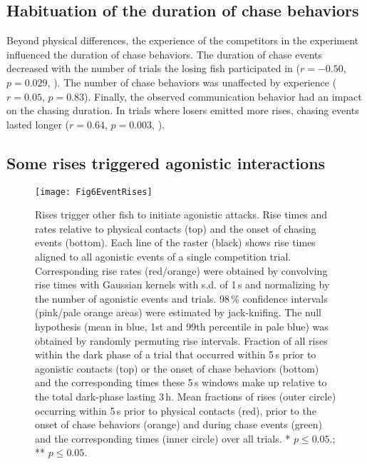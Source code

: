 \subsection{Habituation of the duration of chase behaviors}

Beyond physical differences, the experience of the competitors in the experiment influenced the duration of chase behaviors. The duration of chase events decreased with the number of trials the losing fish participated in ($r=-0.50$, $p=0.029$, ). The number of chase behaviors was unaffected by experience ($r=0.05$, $p=0.83$). Finally, the observed communication behavior had an impact on the chasing duration. In trials where losers emitted more rises, chasing events lasted longer ($r=0.64$, $p=0.003$, ).

\subsection{Some rises triggered agonistic interactions}
 
\begin{figure}[tp]
  \texttt{[image: Fig6EventRises]}
  \caption{\label{event_rises} Rises trigger other fish to initiate agonistic attacks.  Rise times and rates relative to physical contacts (top) and the onset of chasing events (bottom). Each line of the raster (black) shows rise times aligned to all agonistic events of a single competition trial. Corresponding rise rates (red/orange) were obtained by convolving rise times with Gaussian kernels with s.d. of 1\,s and normalizing by the number of agonistic events and trials. 98\,\% confidence intervals (pink/pale orange areas) were estimated by jack-knifing. The null hypothesis (mean in blue, 1st and 99th percentile in pale blue) was obtained by randomly permuting rise intervals.  Fraction of all rises within the dark phase of a trial that occurred within 5\,s prior to agonistic contacts (top) or the onset of chase behaviors (bottom) and the corresponding times these 5\,s windows make up relative to
the total dark-phase lasting 3\,h.  Mean fractions of rises (outer circle) occurring within 5\,s prior to physical contacts (red), prior to the onset of chase behaviors (orange) and during chase events (green) and the corresponding times (inner circle) over all trials. * $p \leq 0.05$.; ** $p \leq 0.05$.}
\end{figure}

